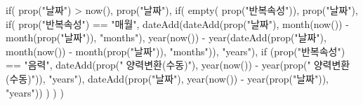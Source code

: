if(
    prop("날짜") > now(), prop("날짜"), 
    if(
        empty(
            prop("반복속성")), 
            prop("날짜"), 
                if(
        prop("반복속성") == "매월", dateAdd(dateAdd(prop("날짜"), month(now()) - month(prop("날짜")), "months"), year(now()) - year(dateAdd(prop("날짜"), month(now()) - month(prop("날짜")), "months")), "years"), 
    if
    (prop("반복속성") == "음력", dateAdd(prop("🔘양력변환(수동)"), year(now()) - year(prop("🔘양력변환(수동)")), "years"), dateAdd(prop("날짜"), year(now()) - year(prop("날짜")), "years"))
    )
    )
    )
